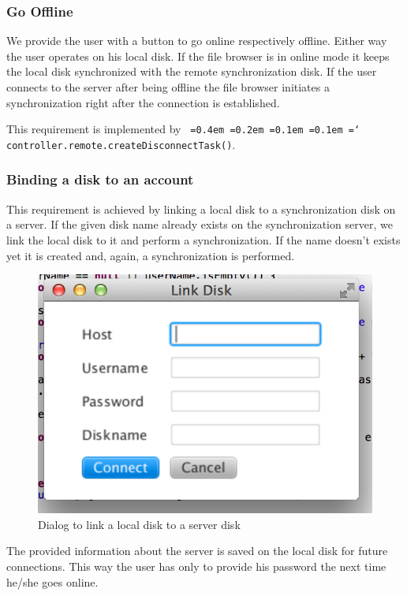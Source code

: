 \documentclass[a4paper,12pt]{article}
\newcommand*\justify{%
  \fontdimen2\font=0.4em%
  \fontdimen3\font=0.2em%
  \fontdimen4\font=0.1em%
  \fontdimen7\font=0.1em%
  \hyphenchar\font=`\-%
}
\newcommand{\mono}[1]{\texttt{\justify #1}}
\begin{document}
\subsubsection{Go Offline}
We provide the user with a button to go online respectively offline. Either way the user operates on his local disk. If the file browser is in online mode it keeps the local disk synchronized with the remote synchronization disk. If the user connects to the server after being offline the file browser initiates a synchronization right after the connection is established.

This requirement is implemented by \mono{controller.remote.createDisconnectTask()}.

\subsubsection{Binding a disk to an account}
This requirement is achieved by linking a local disk to a synchronization disk on a server. If the given disk name already exists on the synchronization server, we link the local disk to it and perform a synchronization. If the name doesn't exists yet it is created and, again, a synchronization is performed.

\begin{figure}[H]\centering
    \includegraphics[scale=0.7]{link.png}
    \caption{Dialog to link a local disk to a server disk}
\end{figure}

The provided information about the server is saved on the local disk for future connections. This way the user has only to provide his password the next time he/she goes online.
\end{document}
